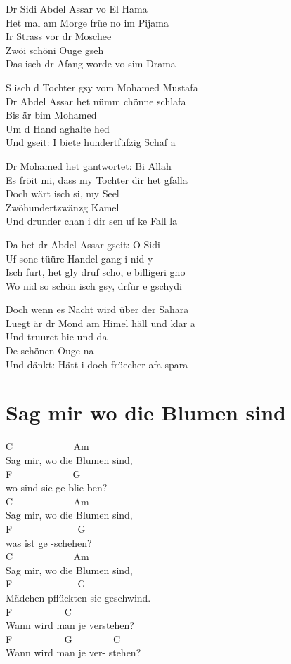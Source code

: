 \documentclass[
  letterpaper,
]{scrbook}
\begin{document}
Dr Sidi Abdel Assar vo El Hama\\
Het mal am Morge früe no im Pijama\\
Ir Strass vor dr Moschee\\
Zwöi schöni Ouge gseh\\
Das isch dr Afang worde vo sim Drama

S isch d Tochter gsy vom Mohamed Mustafa\\
Dr Abdel Assar het nümm chönne schlafa\\
Bis är bim Mohamed\\
Um d Hand aghalte hed\\
Und gseit: I biete hundertfüfzig Schaf a

Dr Mohamed het gantwortet: Bi Allah\\
Es fröit mi, dass my Tochter dir het gfalla\\
Doch wärt isch si, my Seel\\
Zwöhundertzwänzg Kamel\\
Und drunder chan i dir sen uf ke Fall la

Da het dr Abdel Assar gseit: O Sidi\\
Uf sone tüüre Handel gang i nid y\\
Isch furt, het gly druf scho, e billigeri gno\\
Wo nid so schön isch gsy, drfür e gschydi

Doch wenn es Nacht wird über der Sahara\\
Luegt är dr Mond am Himel häll und klar a\\
Und truuret hie und da\\
De schönen Ouge na\\
Und dänkt: Hätt i doch früecher afa spara

\hypertarget{sag-mir-wo-die-blumen-sind}{%
\chapter{Sag mir wo die Blumen sind}\label{sag-mir-wo-die-blumen-sind}}

C ~ ~ ~ ~ ~ ~ ~ Am ~ ~ ~ ~ ~\\
Sag mir, wo die Blumen sind,\\
F ~ ~ ~ ~ ~ ~ ~ G\\
wo sind sie ge-blie-ben?\\
C ~ ~ ~ ~ ~ ~ ~ Am ~ ~ ~ ~ ~\\
Sag mir, wo die Blumen sind,\\
F ~ ~ ~ ~ ~ ~ ~ ~G\\
was ist ge -schehen?\\
C ~ ~ ~ ~ ~ ~ ~ Am ~ ~ ~ ~ ~\\
Sag mir, wo die Blumen sind,\\
F ~ ~ ~ ~ ~ ~ ~ ~G\\
Mädchen pflückten sie geschwind.\\
F ~ ~ ~ ~ ~ ~ C ~ ~ ~ ~ ~ ~ ~ ~\\
Wann wird man je verstehen? ~ ~\\
F ~ ~ ~ ~ ~ ~ G ~ ~ ~ ~ ~C\\
Wann wird man je ver- stehen?
\end{document}

